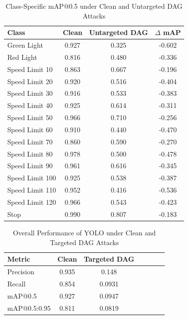 \documentclass[../main.tex]{subfiles}
\begin{document}
\begin{table}[H]
    \centering
    \caption{Class-Specific mAP@0.5 under Clean and Untargeted DAG Attacks}
    \label{tab:yolo_dag_untargeted_class_results}
    \footnotesize
    \begin{tabular}{@{\hspace{0.3cm}}lS[table-format=1.3]S[table-format=1.3]S[table-format=-1.3]@{\hspace{0.3cm}}}
        \toprule
        \textbf{Class} & {\textbf{Clean}} & {\textbf{Untargeted DAG}} & {\textbf{$\Delta$ mAP}} \\
        \midrule
        Green Light    & 0.927 & 0.325 & -0.602 \\
        Red Light      & 0.816 & 0.480 & -0.336 \\
        Speed Limit 10 & 0.863 & 0.667 & -0.196 \\
        Speed Limit 20 & 0.920 & 0.516 & -0.404 \\
        Speed Limit 30 & 0.916 & 0.533 & -0.383 \\
        Speed Limit 40 & 0.925 & 0.614 & -0.311 \\
        Speed Limit 50 & 0.966 & 0.710 & -0.256 \\
        Speed Limit 60 & 0.910 & 0.440 & -0.470 \\
        Speed Limit 70 & 0.860 & 0.590 & -0.270 \\
        Speed Limit 80 & 0.978 & 0.500 & -0.478 \\
        Speed Limit 90 & 0.961 & 0.616 & -0.345 \\
        Speed Limit 100 & 0.925 & 0.538 & -0.387 \\
        Speed Limit 110 & 0.952 & 0.416 & -0.536 \\
        Speed Limit 120 & 0.966 & 0.543 & -0.423 \\
        Stop           & 0.990 & 0.807 & -0.183 \\
        \bottomrule
    \end{tabular}
\end{table}

\begin{table}[H]
    \centering
    \caption{Overall Performance of YOLO under Clean and Targeted DAG Attacks}
    \label{tab:yolo_dag_targeted_overall_performance}
    \footnotesize
    \begin{tabular}{@{\hspace{0.3cm}}lS[table-format=1.3]S[table-format=1.3]S[table-format=1.3]S[table-format=1.3]S[table-format=1.3]S[table-format=1.3]@{\hspace{0.3cm}}}
        \toprule
        \textbf{Metric} & {\textbf{Clean}} & {\textbf{Targeted DAG}} \\
        \midrule
        Precision & 0.935 & 0.148 \\
        Recall & 0.854 & 0.0931 \\
        mAP@0.5 & 0.927 & 0.0947 \\
        mAP@0.5:0.95 & 0.811 & 0.0819 \\
        \bottomrule
    \end{tabular}
\end{table}
\end{document}
